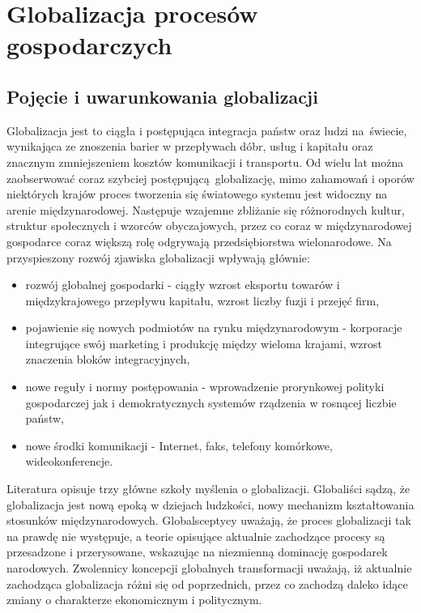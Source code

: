 \documentclass[12pt]{extarticle}
\begin{document}
\section{Globalizacja procesów gospodarczych}

\subsection{Pojęcie i uwarunkowania globalizacji}

Globalizacja jest to ciągła i postępująca integracja państw oraz ludzi na świecie, wynikająca ze znoszenia barier w przepływach dóbr, usług i kapitału oraz znacznym zmniejszeniem kosztów komunikacji i transportu. Od wielu lat można zaobserwować coraz szybciej postępującą globalizację, mimo zahamowań i oporów niektórych krajów proces tworzenia się światowego systemu jest widoczny na arenie międzynarodowej. Następuje wzajemne zbliżanie się różnorodnych kultur, struktur społecznych i wzorców obyczajowych, przez co coraz w międzynarodowej gospodarce coraz większą rolę odgrywają przedsiębiorstwa wielonarodowe. Na przyspieszony rozwój zjawiska globalizacji wpływają głównie:

\begin{itemize}
	\item rozwój globalnej gospodarki - ciągły wzrost eksportu towarów i międzykrajowego przepływu kapitału, wzrost liczby fuzji i przejęć firm,
	\item pojawienie się nowych podmiotów na rynku międzynarodowym - korporacje integrujące swój marketing i produkcję między wieloma krajami, wzrost znaczenia bloków integracyjnych,
	\item nowe reguły i normy postępowania - wprowadzenie prorynkowej polityki gospodarczej jak i demokratycznych systemów rządzenia w rosnącej liczbie państw,
	\item nowe środki komunikacji - Internet, faks, telefony komórkowe, wideokonferencje.
\end{itemize}

Literatura opisuje trzy główne szkoły myślenia o globalizacji. Globaliści sądzą, że globalizacja jest nową epoką w dziejach ludzkości, nowy mechanizm kształtowania stosunków międzynarodowych. Globalsceptycy uważają, że proces globalizacji tak na prawdę nie występuje, a teorie opisujące aktualnie zachodzące procesy są przesadzone i przerysowane, wskazując na niezmienną dominację gospodarek narodowych. Zwolennicy koncepcji globalnych transformacji uważają, iż aktualnie zachodząca globalizacja różni się od poprzednich, przez co zachodzą daleko idące zmiany o charakterze ekonomicznym i politycznym.
\end{document}
